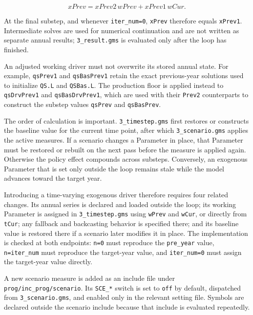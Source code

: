 \begin{equation}
  xPrev = xPrev2\,wPrev + xPrev1\,wCur.
\end{equation}

At the final substep, and whenever \texttt{iter\_num=0}, \texttt{xPrev} therefore equals \texttt{xPrev1}. Intermediate solves are used for numerical continuation and are not written as separate annual results; \texttt{3\_result.gms} is evaluated only after the loop has finished.

An adjusted working driver must not overwrite its stored annual state. For example, \texttt{qsPrev1} and \texttt{qsBasPrev1} retain the exact previous-year solutions used to initialize \texttt{QS.L} and \texttt{QSBas.L}. The production floor is applied instead to \texttt{qsDrvPrev1} and \texttt{qsBasDrvPrev1}, which are used with their \texttt{Prev2} counterparts to construct the substep values \texttt{qsPrev} and \texttt{qsBasPrev}.

The order of calculation is important. \texttt{3\_timestep.gms} first restores or constructs the baseline value for the current time point, after which \texttt{3\_scenario.gms} applies the active measures. If a scenario changes a Parameter in place, that Parameter must be restored or rebuilt on the next pass before the measure is applied again. Otherwise the policy effect compounds across substeps. Conversely, an exogenous Parameter that is set only outside the loop remains stale while the model advances toward the target year.

Introducing a time-varying exogenous driver therefore requires four related changes. Its annual series is declared and loaded outside the loop; its working Parameter is assigned in \texttt{3\_timestep.gms} using \texttt{wPrev} and \texttt{wCur}, or directly from \texttt{tCur}; any fallback and backcasting behavior is specified there; and its baseline value is restored there if a scenario later modifies it in place. The implementation is checked at both endpoints: \texttt{n=0} must reproduce the \texttt{pre\_year} value, \texttt{n=iter\_num} must reproduce the target-year value, and \texttt{iter\_num=0} must assign the target-year value directly.

A new scenario measure is added as an include file under \texttt{prog/inc\_prog/scenario}. Its \texttt{SCE\_*} switch is set to \texttt{off} by default, dispatched from \texttt{3\_scenario.gms}, and enabled only in the relevant setting file. Symbols are declared outside the scenario include because that include is evaluated repeatedly.

